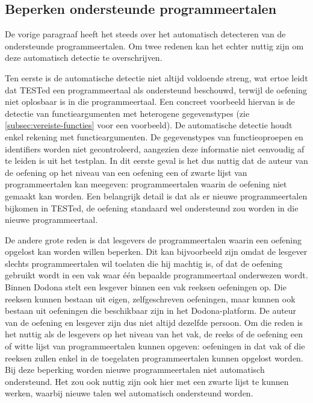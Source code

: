 \subsection{Beperken ondersteunde programmeertalen}\label{subsec:beperken-beschikbare-programmeertalen}

De vorige paragraaf heeft het steeds over het automatisch detecteren van de ondersteunde programmeertalen.
Om twee redenen kan het echter nuttig zijn om deze automatisch detectie te overschrijven.

Ten eerste is de automatische detectie niet altijd voldoende streng, wat ertoe leidt dat TESTed een programmeertaal als ondersteund beschouwd, terwijl de oefening niet oplosbaar is in die programmeertaal.
Een concreet voorbeeld hiervan is de detectie van functieargumenten met heterogene gegevenstypes (zie \cref{subsec:vereiste-functies} voor een voorbeeld).
De automatische detectie houdt enkel rekening met  functieargumenten.
De gegevenstypes van functieoproepen en identifiers worden niet gecontroleerd, aangezien deze informatie niet eenvoudig af te leiden is uit het testplan.
In dit eerste geval is het dus nuttig dat de auteur van de oefening op het niveau van een oefening een  of zwarte lijst van programmeertalen kan meegeven: programmeertalen waarin de oefening niet gemaakt kan worden.
Een belangrijk detail is dat als er nieuwe programmeertalen bijkomen in TESTed, de oefening standaard wel ondersteund zou worden in die nieuwe programmeertaal.

De andere grote reden is dat lesgevers de programmeertalen waarin een oefening opgelost kan worden willen beperken.
Dit kan bijvoorbeeld zijn omdat de lesgever slechts programmeertalen wil toelaten die hij machtig is, of dat de oefening gebruikt wordt in een vak waar één bepaalde programmeertaal onderwezen wordt.
Binnen Dodona stelt een lesgever binnen een vak reeksen oefeningen op.
Die reeksen kunnen bestaan uit eigen, zelfgeschreven oefeningen, maar kunnen ook bestaan uit oefeningen die beschikbaar zijn in het Dodona-platform.
De auteur van de oefening en lesgever zijn dus niet altijd dezelfde persoon.
Om die reden is het nuttig als de lesgevers op het niveau van het vak, de reeks of de oefening een  of witte lijst van programmeertalen kunnen opgeven: oefeningen in dat vak of die reeksen zullen enkel in de toegelaten programmeertalen kunnen opgelost worden.
Bij deze beperking worden nieuwe programmeertalen niet automatisch ondersteund.
Het zou ook nuttig zijn ook hier met een zwarte lijst te kunnen werken, waarbij nieuwe talen wel automatisch ondersteund worden.

